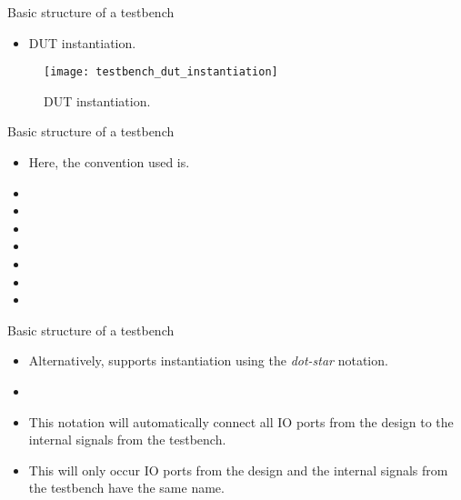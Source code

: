 %
\begin{frame}{Basic structure of a testbench}{}
\begin{itemize}
\item \ac{DUT} instantiation.
\end{itemize}
  \begin{figure}
    \centering
    \texttt{[image: testbench\_dut\_instantiation]}
    \vspace{-2pt}
    \caption{\ac{DUT} instantiation.}
    \label{Figure:DUT_instantiation}
  \end{figure}
\end{frame}

%
\begin{frame}{Basic structure of a testbench}{}
\begin{itemize}
\item Here, the convention used is.
\item[] \code{\textcolor{blue}{design\_name}}
\item[] 
\item[] 
\item[] 
\item[] \code{~~~~~~~~~~~~~~~~~$\vdots$}
\item[] 
\item[] \code{~~~~~~~~~~~~~~~~~);}
\end{itemize}
\end{frame}


%
\begin{frame}{Basic structure of a testbench}{}
\begin{itemize}
\item Alternatively, \SV supports instantiation using the \emph{dot-star} notation.
\item[] 
\item This notation will automatically connect all \ac{IO} ports from the design to the internal signals from the testbench.
\item This will only occur  \ac{IO} ports from the design and the internal signals from the testbench have the same name.
\end{itemize}
\end{frame}


